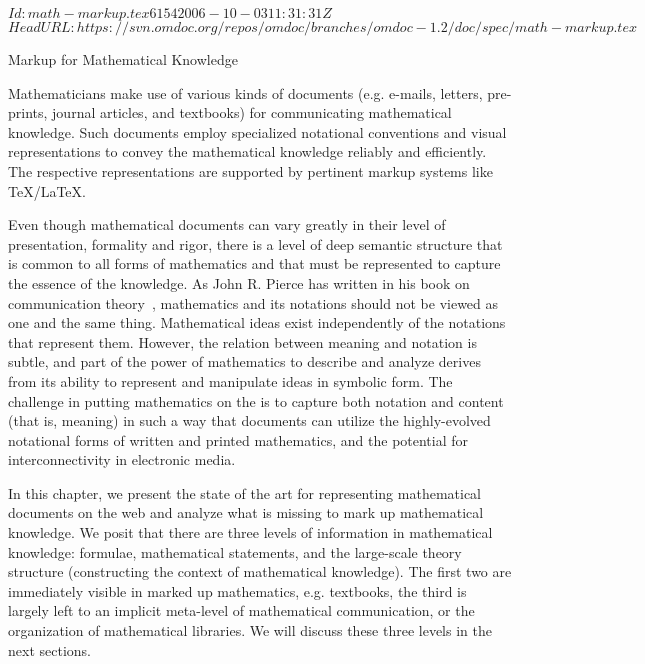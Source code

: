 \svnInfo $Id: math-markup.tex 6154 2006-10-03 11:31:31Z  $
\svnKeyword $HeadURL: https://svn.omdoc.org/repos/omdoc/branches/omdoc-1.2/doc/spec/math-markup.tex $

\begin{tchapter}[id=math-markup]{Markup for Mathematical Knowledge}

  Mathematicians make use of various kinds of documents (e.g. e-mails, letters,
  pre-prints, journal articles, and textbooks) for communicating mathematical
  knowledge. Such documents employ specialized notational conventions and visual
  representations to convey the mathematical knowledge reliably and efficiently.  The
  respective representations are supported by pertinent   markup systems like
  {\TeX/\LaTeX}.

  Even though mathematical documents can vary greatly in their level of presentation,
  formality and rigor, there is a level of deep semantic structure that is common to all
  forms of mathematics and that must be represented to capture the essence of the
  knowledge. As John R. Pierce has written in his book on communication
  theory~\cite{Pierce:aitit80}, mathematics and its notations should not be viewed as one
  and the same thing. Mathematical ideas exist independently of the notations that
  represent them. However, the relation between meaning and notation is subtle, and part
  of the power of mathematics to describe and analyze derives from its ability to
  represent and manipulate ideas in symbolic form. The challenge in putting mathematics on
  the {} is to capture both notation and content (that is,
  meaning) in such a way that documents can utilize the highly-evolved notational forms of
  written and printed mathematics, and the potential for interconnectivity in electronic
  media.

  In this chapter, we present the state of the art for representing mathematical documents
  on the web and analyze what is missing to mark up mathematical knowledge.  We posit that
  there are three levels of information in mathematical knowledge: formulae, mathematical
  statements, and the large-scale theory structure (constructing the context of
  mathematical knowledge). The first two are immediately visible in marked up mathematics,
  e.g.  textbooks, the third is largely left to an implicit meta-level of mathematical
  communication, or the organization of mathematical libraries. We will discuss these
  three levels in the next sections.


\end{tchapter}
